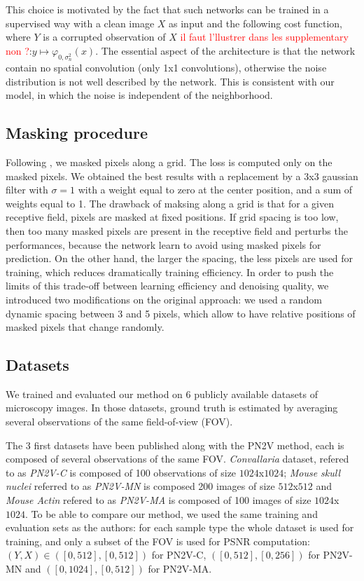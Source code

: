 \documentclass{article}
\begin{document}
This choice is motivated by the fact that such networks can be trained in a supervised way with a clean image $X$ as input and the following cost function, where $Y$ is a corrupted observation of $X$ \textcolor{red}{il faut l'llustrer dans les supplementary non ?}:$y\mapsto\varphi_{0,\sigma_n^2}(x)$.
The essential aspect of the architecture is that the network contain no spatial convolution (only 1x1 convolutions), otherwise the noise distribution is not well described by the network. This is consistent with our model, in which the noise is independent of the neighborhood.

\subsection{Masking procedure}
Following \cite{batson2019noise2self}, we masked pixels along a grid. The loss is computed only on the masked pixels.
We obtained the best results with a replacement by a 3x3 gaussian filter with $\sigma=1$ with a weight equal to zero at the center position, and a sum of weights equal to 1.
The drawback of maksing along a grid is that for a given receptive field, pixels are masked at fixed positions. If grid spacing is too low, then too many masked pixels are present in the receptive field and perturbs the performances, because the network learn to avoid using masked pixels for prediction. On the other hand, the larger the spacing, the less pixels are used for training, which reduces dramatically training efficiency.
In order to push the limits of this trade-off between learning efficiency and denoising quality, we introduced two modifications on the original approach: we used a random dynamic spacing between 3 and 5 pixels, which allow to have relative positions of masked pixels that change randomly.

\subsection{Datasets}
We trained and evaluated our method on 6 publicly available datasets of microscopy images. In those datasets, ground truth is estimated by averaging several observations of the same field-of-view (FOV).

The 3 first datasets have been published along with the PN2V method\cite{krull2019probabilistic}, each is composed of several observations of the same FOV. \emph{Convallaria} dataset, refered to as \emph{PN2V-C} is composed of 100 observations of size $1024$x$1024$; \emph{Mouse skull nuclei} referred to as \emph{PN2V-MN} is composed 200 images of size $512$x$512$ and \emph{Mouse Actin} refered to as \emph{PN2V-MA} is composed of 100 images of size $1024$x$1024$.
To be able to compare our method, we used the same training and evaluation sets as the authors: for each sample type the whole dataset is used for training, and only a subset of the FOV is used for PSNR computation: $(Y,X)\in([0, 512], [0, 512])$ for PN2V-C, $([0, 512], [0, 256])$ for PN2V-MN and $([0, 1024], [0, 512])$ for PN2V-MA.
\end{document}
